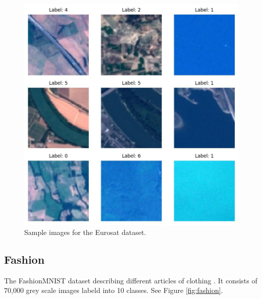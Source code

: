 \documentclass[letterpaper]{article} %
\theoremstyle{plain}
\theoremstyle{definition}
\theoremstyle{remark}
\begin{document}
\begin{figure}[htbp]
    \centering
    \includegraphics[width=\columnwidth]{../../images/eurosat_1_sample.jpg}
    \caption{Sample images for the Eurosat dataset.}
    \label{fig:eurosat}
\end{figure}


\subsection{Fashion} The FashionMNIST dataset describing different articles of clothing \citep{fashion}. It consists of 70,000 grey scale images labeld into 10 classes. See Figure \ref{fig:fashion}.
\end{document}
